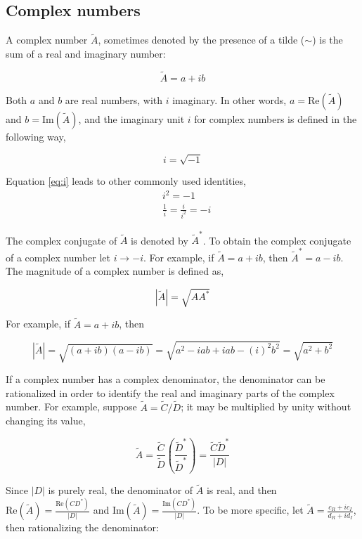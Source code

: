 \documentclass[12pt]{article}
\begin{document}
\begin{flushleft}

\subsection*{\color{myblue} Complex numbers}

A complex number $\tilde{A}$, sometimes denoted by the presence of a tilde ($\sim$) is the sum of a real and imaginary number:

\[
\tilde{A} = a + ib
\]

Both $a$ and $b$ are real numbers, with $i$ imaginary.  In other words, $a=\text{Re}(\tilde{A})$ and $b=\text{Im}(\tilde{A})$, and the imaginary unit $i$ for complex numbers is defined in the following way,

\begin{equation}
i=\sqrt{-1}
\label{eq:i}
\end{equation}

Equation \ref{eq:i} leads to other commonly used identities,
\begin{equation*}
\begin{aligned}
& i^{2} = -1 \\
& \frac{1}{i} = \frac{i}{i^{2}} = -i
\end{aligned}
\end{equation*}

The complex conjugate of $\tilde{A}$ is denoted by $\tilde{A}^{*}$.  To obtain the complex conjugate of a complex number let $i \rightarrow -i$.  For example, if $\tilde{A}=a+ib$, then $\tilde{A}^{*}=a -ib$.  The magnitude of a complex number is defined as,

\[
|\tilde{A}| = \sqrt{AA^{*}}
\]

For example, if $\tilde{A} = a + ib$, then

\[
|\tilde{A}| = \sqrt{(a+ib)(a-ib)} = \sqrt{a^{2}-iab +iab -(i)^{2}b^{2}} = \sqrt{a^{2}+b^{2}}
\]

If a complex number has a complex denominator, the denominator can be rationalized in order to identify the real and imaginary parts of the complex number.  For example, suppose $\tilde{A}=\tilde{C}/\tilde{D}$; it may be multiplied by unity without changing its value,

\[
\tilde{A}=\frac{\tilde{C}}{\tilde{D}}\left( \frac{\tilde{D}^{*}}{\tilde{D}^{*}} \right) = \frac{\tilde{C}\tilde{D}^{*}}{|D|}
\]

Since $|D|$ is purely real, the denominator of $\tilde{A}$ is real, and then $\text{Re}(\tilde{A})=\frac{\text{Re}(CD^{*})}{|D|}$ and $\text{Im}(\tilde{A})=\frac{\text{Im}(CD^{*})}{|D|}$.  To be more specific, let $\tilde{A}=\frac{c_{R}+ic_{I}}{d_{R}+id_{I}}$, then rationalizing the denominator:


\end{flushleft}
\end{document}
